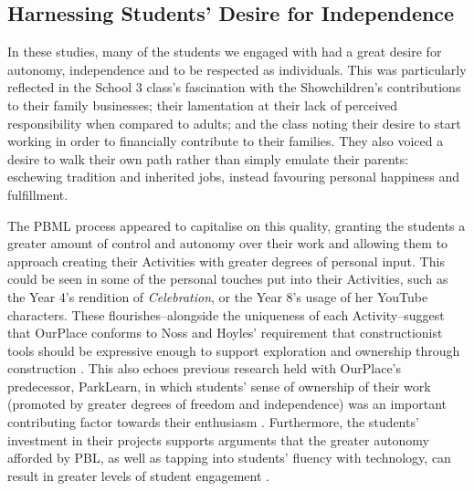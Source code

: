\documentclass[,hyphens]{sigchi}
\begin{document}
\subsection{Harnessing Students' Desire for Independence}
In these studies, many of the students we engaged with had a great desire for autonomy, independence and to be respected as individuals. This was particularly reflected in the School 3 class's fascination with the Showchildren's contributions to their family businesses; their lamentation at their lack of perceived responsibility when compared to adults; and the class noting their desire to start working in order to financially contribute to their families. They also voiced a desire to walk their own path rather than simply emulate their parents: eschewing tradition and inherited jobs, instead favouring personal happiness and fulfillment. 

The PBML process appeared to capitalise on this quality, granting the students a greater amount of control and autonomy over their work and allowing them to approach creating their Activities with greater degrees of personal input. This could be seen in some of the personal touches put into their Activities, such as the Year 4's rendition of \textit{Celebration}, or the Year 8's usage of her YouTube characters. These flourishes--alongside the uniqueness of each Activity--suggest that OurPlace conforms to Noss and Hoyles' requirement that constructionist tools should be expressive enough to support exploration and ownership through construction \cite{Noss2017}. This also echoes previous research held with OurPlace's predecessor, ParkLearn, in which students' sense of ownership of their work (promoted by greater degrees of freedom and independence) was an important contributing factor towards their enthusiasm \cite{Richardson2018}. Furthermore, the students' investment in their projects supports arguments that the greater autonomy afforded by PBL, as well as tapping into students' fluency with technology, can result in greater levels of student engagement \cite{Wurdinger2007, Bell2010}.
\end{document}
